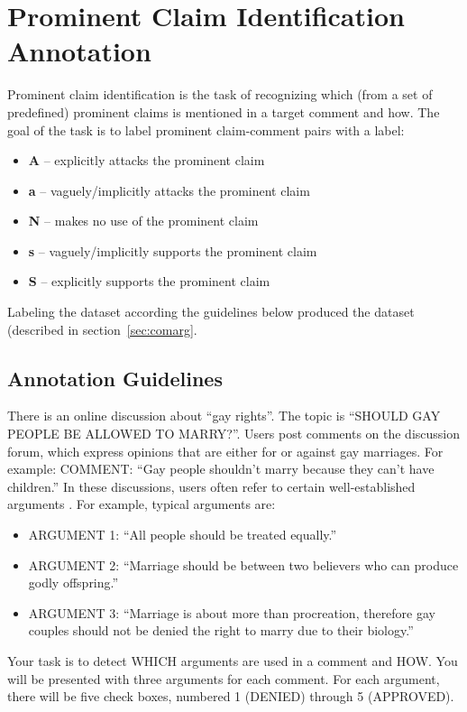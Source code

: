 \section{Prominent Claim Identification Annotation}
\label{sec:argrec_annotation}

Prominent claim identification is the task of recognizing which (from a set of
predefined) prominent claims is mentioned in a target comment and how. The goal
of the task is to label prominent claim-comment pairs with a label:
\begin{itemize}
	\item \textbf{A} -- explicitly attacks the prominent claim
	\item \textbf{a} -- vaguely/implicitly attacks the prominent claim
	\item \textbf{N} -- makes no use of the prominent claim
	\item \textbf{s} -- vaguely/implicitly supports the prominent claim
	\item \textbf{S} -- explicitly supports the prominent claim
\end{itemize}
Labeling the dataset according the guidelines below
produced the \ComArg dataset (described in section~\ref{sec:comarg}.

\subsection*{Annotation Guidelines}

There is an online discussion about ``gay rights''. The topic is ``SHOULD GAY
PEOPLE BE ALLOWED TO MARRY?''. Users post comments on the discussion forum,
which express opinions that are either for or against gay marriages. For
example: COMMENT: ``Gay people shouldn’t marry because they can’t have
children.''
In these discussions, users often refer to certain well-established arguments .
For example, typical arguments are:
\begin{itemize}
\item ARGUMENT 1: ``All people should be treated equally.''
\item ARGUMENT 2: ``Marriage should be between two believers who can produce godly offspring.''
\item ARGUMENT 3: ``Marriage is about more than procreation, therefore gay couples should not be denied the right to marry due to their biology.''
\end{itemize}

\noindent Your task is to detect WHICH arguments are used in a comment and HOW. You will
be presented with three arguments for each comment. For each argument, there
will be five check boxes, numbered 1 (DENIED) through 5 (APPROVED). 

